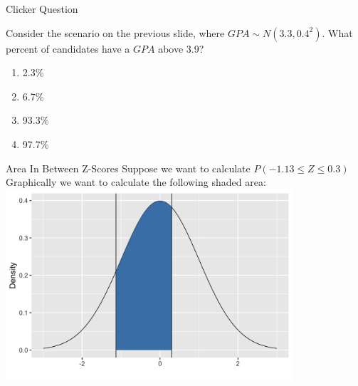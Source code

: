 \documentclass{beamer}
\begin{document}
\begin{frame}{Clicker Question}
	
	Consider the scenario on the previous slide, where $GPA \sim N(3.3,0.4^2)$. What percent of candidates have a $GPA$ above 3.9?
	
	\begin{enumerate}[label=(\alph*)]
		\item 2.3\%
		\item 6.7\% %
		\item 93.3\%
		\item 97.7\%
	\end{enumerate}
	
\end{frame}

%

\begin{frame}{Area In Between Z-Scores}
	Suppose we want to calculate $P(-1.13 \leq Z \leq 0.3)$
	Graphically we want to calculate the following shaded area:
	\includegraphics[width=0.8\textwidth]{areabetweenstdnorm}
\end{frame}
\end{document}
